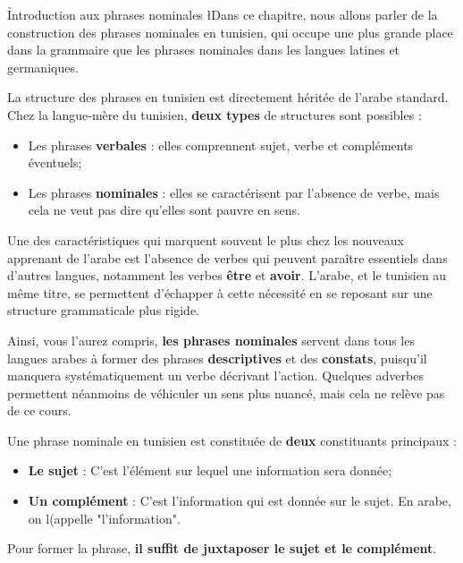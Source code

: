 \h{Introduction aux phrases nominales}
\l{D}ans ce chapitre, nous allons parler de la construction des phrases nominales en tunisien, qui occupe une plus grande place dans la grammaire que les phrases nominales dans les langues latines et germaniques. 

La structure des phrases en tunisien est directement héritée de l'arabe standard. Chez la langue-mère du tunisien, \textbf{deux types} de structures sont possibles :
\begin{itemize}
    \item Les phrases \textbf{verbales} : elles comprennent sujet, verbe et compléments éventuels;
    \item Les phrases \textbf{nominales} : elles se caractérisent par l'absence de verbe, mais cela ne veut pas dire qu'elles sont pauvre en sens.
\end{itemize}

Une des caractéristiques qui marquent souvent le plus chez les nouveaux apprenant de l'arabe est l'absence de verbes qui peuvent paraître essentiels dans d'autres langues, notamment les verbes \textbf{être} et \textbf{avoir}. L'arabe, et le tunisien au même titre, se permettent d'échapper à cette nécessité en se reposant sur une structure grammaticale plus rigide. 

Ainsi, vous l'aurez compris, \textbf{les phrases nominales} servent dans tous les langues arabes à former des phrases \textbf{descriptives} et des \textbf{constats}, puisqu'il manquera systématiquement un verbe décrivant l'action. Quelques adverbes permettent néanmoins de véhiculer un sens plus nuancé, mais cela ne relève pas de ce cours. 

Une phrase nominale en tunisien est constituée de \textbf{deux} constituants principaux :
\begin{itemize}
    \item \textbf{Le sujet} : C'est l'élément sur lequel une information sera donnée;
    \item \textbf{Un complément} : C'est l'information qui est donnée sur le sujet. En arabe, on l(appelle "l'information".
\end{itemize}

Pour former la phrase, \textbf{il suffit de juxtaposer le sujet et le complément}.


